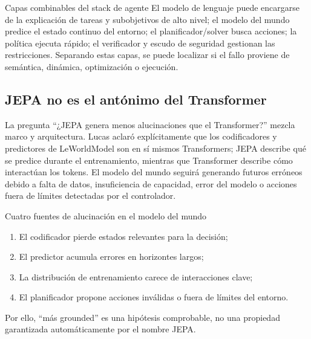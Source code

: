 \documentclass[a4paper]{article}
\begin{document}
\begin{knowledgebox}{Capas combinables del stack de agente}
El modelo de lenguaje puede encargarse de la explicación de tareas y subobjetivos de alto nivel; el modelo del mundo predice el estado continuo del entorno; el planificador/solver busca acciones; la política ejecuta rápido; el verificador y escudo de seguridad gestionan las restricciones. Separando estas capas, se puede localizar si el fallo proviene de semántica, dinámica, optimización o ejecución.
\end{knowledgebox}

\subsection{JEPA no es el antónimo del Transformer}

La pregunta ``¿JEPA genera menos alucinaciones que el Transformer?'' mezcla marco y arquitectura. Lucas aclaró explícitamente que los codificadores y predictores de LeWorldModel son en sí mismos Transformers; JEPA describe qué se predice durante el entrenamiento, mientras que Transformer describe cómo interactúan los tokens. El modelo del mundo seguirá generando futuros erróneos debido a falta de datos, insuficiencia de capacidad, error del modelo o acciones fuera de límites detectadas por el controlador.


\begin{warningbox}{Cuatro fuentes de alucinación en el modelo del mundo}
\begin{enumerate}
  \item El codificador pierde estados relevantes para la decisión;
  \item El predictor acumula errores en horizontes largos;
  \item La distribución de entrenamiento carece de interacciones clave;
  \item El planificador propone acciones inválidas o fuera de límites del entorno.
\end{enumerate}
Por ello, ``más grounded'' es una hipótesis comprobable, no una propiedad garantizada automáticamente por el nombre JEPA.
\end{warningbox}
\end{document}
